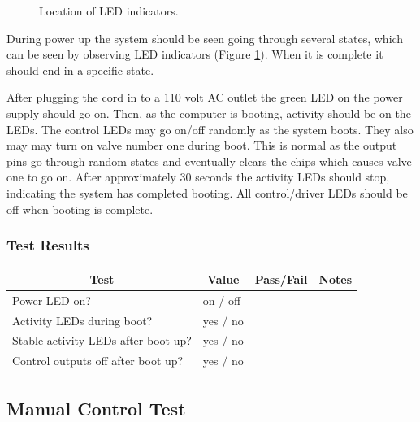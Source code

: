 \documentclass{article}
\begin{document}
\begin{figure}
\caption{Location of LED indicators.}\label{fig:ledind}
\end{figure}

During power up the system should be seen going through several states,
which can be seen by observing LED indicators (Figure \ref{fig:ledind}).
When it is complete it should end in a specific state.

After plugging the cord in to a 110 volt AC outlet the green LED on
the power supply should go on.
Then, as the computer is booting, activity should be on the LEDs.
The control LEDs may go on/off randomly as the system boots.
They also may may turn on valve number one during boot.
This is normal as the output pins go through random states and
eventually clears the chips which causes valve one to go on.
After approximately 30 seconds the activity LEDs should stop,
indicating the system has completed booting.
All control/driver LEDs should be off when booting is complete.

\subsubsection*{Test Results}
\begin{tabular}{|l|l|l|l|}
	\hline
	\multicolumn{1}{|c|}{Test}
	& \multicolumn{1}{|c|}{Value}
	& \multicolumn{1}{|c|}{Pass/Fail}
	& \multicolumn{1}{|c|}{Notes} \\
	\hline
	Power LED on? & on / off && \hspace{1.7in} \\
	\hline
	Activity LEDs during boot? & yes / no && \\
	\hline
	Stable activity LEDs after boot up? & yes / no && \\
	\hline
	Control outputs off after boot up? & yes / no && \\
	\hline
\end{tabular}

\clearpage
\subsection{Manual Control Test}
\end{document}
